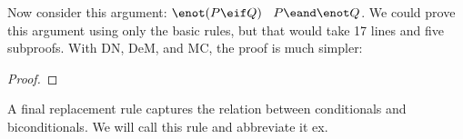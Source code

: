 Now consider this argument: $\enot(P \eif Q)$ \therefore\ $P \eand \enot Q$. We could prove this argument using only the basic rules, but that would take 17 lines and five subproofs. With DN, DeM, and MC, the proof is much simpler:

\begin{proof}
	 
\end{proof}

A final replacement rule captures the relation between conditionals and biconditionals. We will call this rule  and abbreviate it {\eiff}{ex}.
